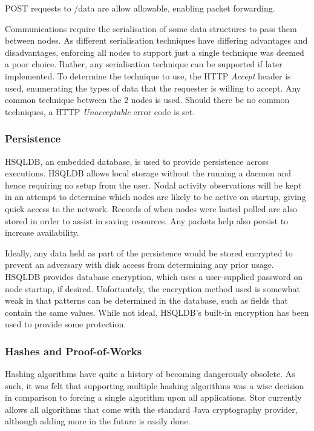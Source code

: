 			POST requests to /data are allow allowable, enabling packet forwarding.
	
			Communications require the serialisation of some data structures to pass them between nodes. As different serialisation techniques have differing advantages and disadvantages, enforcing all nodes to support just a single technique was deemed a poor choice. Rather, any serialisation technique can be supported if later implemented. To determine the technique to use, the HTTP \textit{Accept} header is used, enumerating the types of data that the requester is willing to accept. Any common technique between the 2 nodes is used. Should there be no common techniques, a HTTP \textit{Unacceptable} error code is set.
			
	
		\subsubsection*{Persistence}
			HSQLDB, an embedded database, is used to provide persistence across executions. HSQLDB allows local storage without the running a daemon and hence requiring no setup from the user. Nodal activity observations will be kept in an attempt to determine which nodes are likely to be active on startup, giving quick access to the network. Records of when nodes were lasted polled are also stored in order to assist in saving resources. Any packets help also persist to increase availability.
			
			Ideally, any data held as part of the persistence would be stored encrypted to prevent an adversary with disk access from determining any prior usage. HSQLDB provides database encryption, which uses a user-supplied password on node startup, if desired. Unfortantely, the encryption method used is somewhat weak in that patterns can be determined in the database, such as fields that contain the same values. While not ideal, HSQLDB's built-in encryption has been used to provide some protection.
		\subsubsection*{Hashes and Proof-of-Works}
			Hashing algorithms have quite a history of becoming dangerously obsolete. As such, it was felt that supporting multiple hashing algorithms was a wise decision in comparison to forcing a single algorithm upon all applications. Stor currently allows all algorithms that come with the standard Java cryptography provider, although adding more in the future is easily done. 
		
